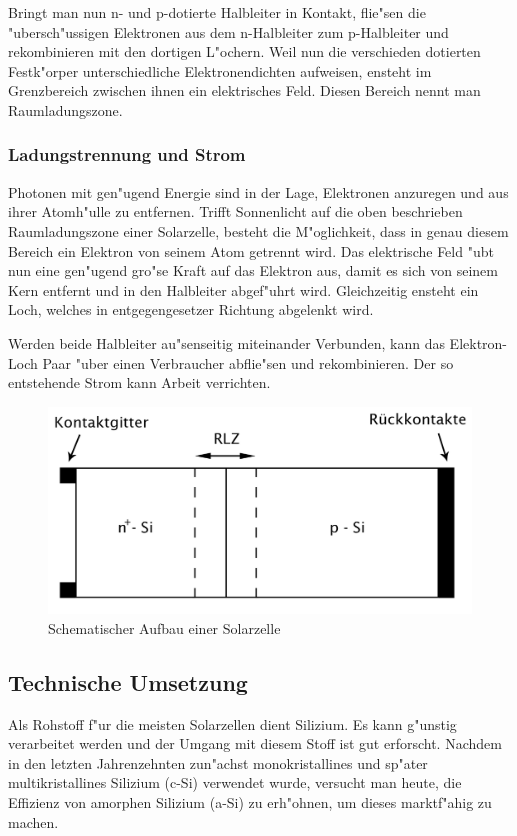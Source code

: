 			Bringt man nun n- und p-dotierte Halbleiter in Kontakt, flie"sen die "ubersch"ussigen Elektronen aus dem n-Halbleiter zum p-Halbleiter und rekombinieren mit den dortigen L"ochern.
			Weil nun die verschieden dotierten Festk"orper unterschiedliche Elektronendichten aufweisen, ensteht im Grenzbereich zwischen ihnen ein elektrisches Feld.
			Diesen Bereich nennt man Raumladungszone.

		\subsubsection{Ladungstrennung und Strom}
			\label{subsub:ladungstrennung}
			Photonen mit gen"ugend Energie sind in der Lage, Elektronen anzuregen und aus ihrer Atomh"ulle zu entfernen.
			Trifft Sonnenlicht auf die oben beschrieben Raumladungszone einer Solarzelle, besteht die M"oglichkeit, dass in genau diesem Bereich ein Elektron von seinem Atom getrennt wird.
			Das elektrische Feld "ubt nun eine gen"ugend gro"se Kraft auf das Elektron aus, damit es sich von seinem Kern entfernt und in den Halbleiter abgef"uhrt wird.
			Gleichzeitig ensteht ein Loch, welches in entgegengesetzer Richtung abgelenkt wird.

			Werden beide Halbleiter au"senseitig miteinander Verbunden, kann das Elektron-Loch Paar "uber einen Verbraucher abflie"sen und rekombinieren.
			Der so entstehende Strom kann Arbeit verrichten.

		\begin{figure}[h]
			\centering
			\includegraphics[width = 15cm]{img/diode_neu.jpg}
			\caption{Schematischer Aufbau einer Solarzelle}
			\label{fig:diode}
		\end{figure}

	\subsection{Technische Umsetzung}
		\label{sub:umsetzung}
		Als Rohstoff f"ur die meisten Solarzellen dient Silizium.
		Es kann g"unstig verarbeitet werden und der Umgang mit diesem Stoff ist gut erforscht.
		Nachdem in den letzten Jahrenzehnten zun"achst monokristallines und sp"ater multikristallines Silizium (c-Si) verwendet wurde,
		versucht man heute, die Effizienz von amorphen Silizium (a-Si) zu erh"ohnen, um dieses marktf"ahig zu machen.

